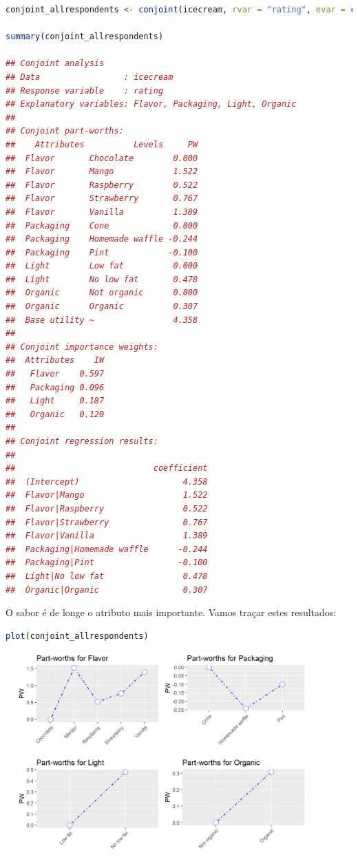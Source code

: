 \documentclass{article}
\begin{document}
\begin{lstlisting}[language=R]
conjoint_allrespondents <- conjoint(icecream, rvar = "rating", evar = c("Flavor","Packaging","Light","Organic")) # como antes, mas com um conjunto de dados diferente.

summary(conjoint_allrespondents) 

## Conjoint analysis
## Data                 : icecream 
## Response variable    : rating 
## Explanatory variables: Flavor, Packaging, Light, Organic 
## 
## Conjoint part-worths:
##    Attributes          Levels     PW
##  Flavor       Chocolate        0.000
##  Flavor       Mango            1.522
##  Flavor       Raspberry        0.522
##  Flavor       Strawberry       0.767
##  Flavor       Vanilla          1.389
##  Packaging    Cone             0.000
##  Packaging    Homemade waffle -0.244
##  Packaging    Pint            -0.100
##  Light        Low fat          0.000
##  Light        No low fat       0.478
##  Organic      Not organic      0.000
##  Organic      Organic          0.307
##  Base utility ~                4.358
## 
## Conjoint importance weights:
##  Attributes    IW
##   Flavor    0.597
##   Packaging 0.096
##   Light     0.187
##   Organic   0.120
## 
## Conjoint regression results:
## 
##                            coefficient
##  (Intercept)                     4.358
##  Flavor|Mango                    1.522
##  Flavor|Raspberry                0.522
##  Flavor|Strawberry               0.767
##  Flavor|Vanilla                  1.389
##  Packaging|Homemade waffle      -0.244
##  Packaging|Pint                 -0.100
##  Light|No low fat                0.478
##  Organic|Organic                 0.307
\end{lstlisting}

O sabor é de longe o atributo mais importante. Vamos traçar estes resultados:

\begin{lstlisting}[language=R]
plot(conjoint_allrespondents)
\end{lstlisting}

\begin{center}
\includegraphics[width=12cm,height=8cm]{conjoint_manyrespondents_plot-1.png}
\end{center}
\end{document}
